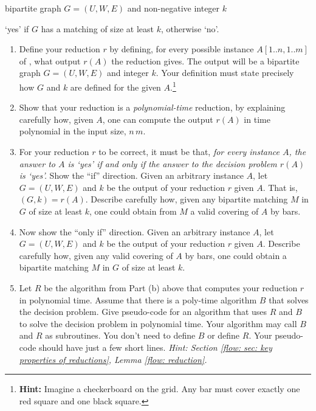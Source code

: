 \documentclass[11pt]{article}
\begin{document}
\begin{mylist}
\item[]  \dotfill\em
\item[\bf input:] bipartite graph $G=(U, W, E)$ and non-negative integer $k$
\item[\bf output:] `\textsf{yes}' if $G$ has a matching of size at least $k$, otherwise `\textsf{no}'.
\end{mylist}


\begin{enumerate}[label=(\alph*)]

\item
  Define your reduction $r$
  by defining, for every possible instance $A[1..n, 1..m]$ of  ,
  what output $r(A)$ the reduction gives.
  The output will be a bipartite graph $G=(U, W, E)$ and integer $k$.
  Your definition must state precisely how $G$ and $k$ are defined for the given $A$.\footnote
  {{\bf Hint:} Imagine a checkerboard on the grid.  Any bar must cover exactly one red square and one black square.}

\item
  Show that your reduction is a \emph{polynomial-time} reduction,
  by explaining carefully how, given $A$, one can compute the output $r(A)$ in time polynomial in the input size, $n\, m$.

\item
  For your reduction $r$ to be correct,
  it must be that, \emph{for every   instance $A$,
    the answer to $A$ is `\textsf{yes}' if and only if the answer to the  decision problem $r(A)$ is `\textsf{yes}'.}
  Show the ``if'' direction.
  Given an arbitrary  instance $A$,
  let $G=(U, W, E)$ and $k$ be the output of your reduction $r$ given $A$.  That is, $(G, k) = r(A)$.
  Describe carefully how, given any bipartite matching $M$ in $G$ of size at least $k$,
  one could obtain from $M$ a valid covering of $A$ by bars.

\item
  Now show the ``only if'' direction.
  Given an arbitrary  instance $A$,
  let $G=(U, W, E)$ and $k$ be the output of your reduction $r$ given $A$.
  Describe carefully how, given any valid covering of $A$ by bars,
  one could obtain a bipartite matching $M$ in $G$ of size at least $k$.

\item
  Let $R$ be the algorithm from Part (b) above that computes your reduction $r$ in polynomial time.
  Assume that there is a poly-time algorithm $B$ that solves the   decision problem.
  Give pseudo-code for an algorithm that uses $R$ and $B$ to solve the  decision problem
  in polynomial time.
  Your algorithm may call $B$ and $R$ as subroutines.  You don't need to define $B$ or define $R$.
  Your pseudo-code should have just a few short lines.
  \emph{Hint: Section \ref{flow: sec: key properties of reductions}, Lemma \ref{flow: reduction}.}


\end{enumerate}
\end{document}
